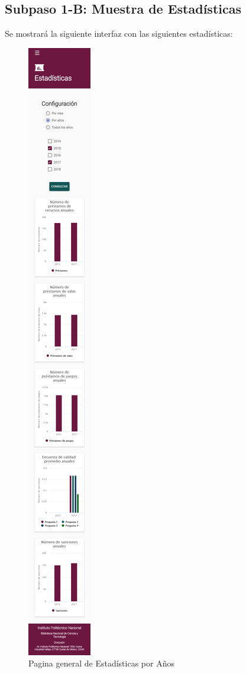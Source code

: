 \subsection{Subpaso 1-B: Muestra de Estadísticas}
	Se mostrará la siguiente interfaz con las siguientes estadísticas:
	\begin{figure}[hbtp]
		\includegraphics[scale=0.3]{images/InterfazMovil/IUGS15_estadisticasAnos.PNG}
		\caption{Pagina general de Estadísticas por Años}
	\end{figure}	
	
